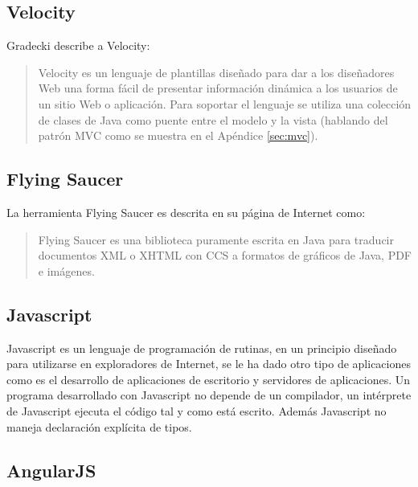 \subsection{Velocity}\label{sec:velocity}
Gradecki\cite{MasteringApacheVelocity} describe a Velocity:

\begin{quote}
	Velocity es un lenguaje de plantillas diseñado para dar a los diseñadores Web una forma fácil de presentar información dinámica a los usuarios de un sitio Web o aplicación. Para soportar el lenguaje se utiliza una colección de clases de Java como puente entre el modelo y la vista (hablando del patrón MVC como se muestra en el Apéndice \ref{sec:mvc}).
\end{quote}

\subsection{Flying Saucer}\label{sec:flying-saucer}
La herramienta Flying Saucer es descrita en su página de Internet\cite{FlyingSaucer} como:
\begin{quote}
	Flying Saucer es una biblioteca puramente escrita en Java para traducir documentos XML o XHTML con CCS a formatos de gráficos de Java, PDF e imágenes.
\end{quote}


\subsection{Javascript}\label{sec:javascript}
Javascript es un lenguaje de programación de rutinas, en un principio diseñado para utilizarse en exploradores de Internet, se le ha dado otro tipo de aplicaciones como es el desarrollo de aplicaciones de escritorio y servidores de aplicaciones. Un programa desarrollado con Javascript no depende de un compilador, un intérprete de Javascript ejecuta el código tal y como está escrito. Además Javascript no maneja declaración explícita de tipos.\cite{LearningWebDesign}

\subsection{AngularJS}\label{sec:angularjs}

